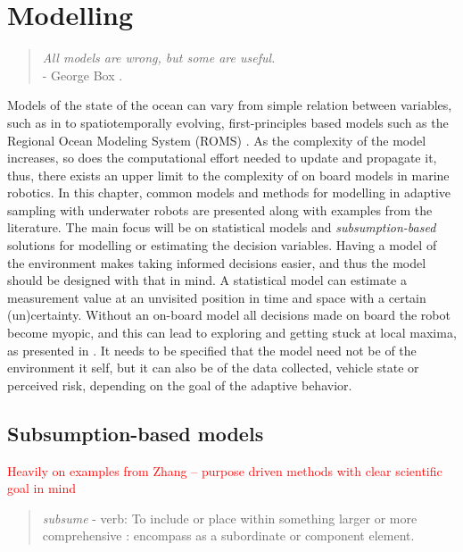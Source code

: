 \chapter{Modelling}
\label{chap:modelling}


\begin{quote}
    \textit{All models are wrong, but some are useful.} \\
    - George Box \cite{box1976science}.
\end{quote}

Models of the state of the ocean can vary from simple relation between variables, such as in \textcite{zhang2019autonomous} to spatiotemporally evolving, first-principles based models such as the Regional Ocean Modeling System (ROMS) \cite{shchepetkin2005regional}. As the complexity of the model increases, so does the computational effort needed to update and propagate it, thus, there exists an upper limit to the complexity of on board models in marine robotics. In this chapter, common models and methods for modelling in adaptive sampling with underwater robots are presented along with examples from the literature. The main focus will be on statistical models and \textit{subsumption-based} \cite{brooks1986robust} solutions for modelling or estimating the decision variables. Having a model of the environment makes taking informed decisions easier, and thus the model should be designed with that in mind. A statistical model can estimate a measurement value at an unvisited position in time and space with a certain (un)certainty. Without an on-board model all decisions made on board the robot become myopic, and this can lead to exploring and getting stuck at local maxima, as presented in \textcite{hwang2019auv}. It needs to be specified that the model need not be of the environment it self, but it can also be of the data collected, vehicle state or perceived risk, depending on the goal of the adaptive behavior.  

\section{Subsumption-based models}
\textcolor{red}{Heavily on examples from Zhang – purpose driven methods with clear scientific goal in mind
}
\begin{quote}
    \textit{subsume} - verb: To include or place within something larger or more comprehensive : encompass as a subordinate or component element.
\end{quote}




